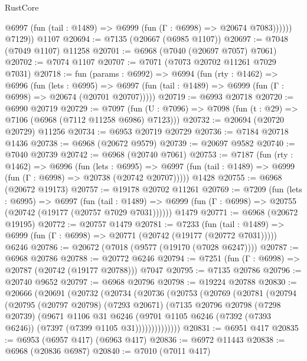 \begin{lexlean}{RustCore}
\begin{coremodule}
              @6997 (fun (tail : @1489) => @6999 (fun (Γ : @6998) => @20674 @7083))))))
        @7129))
    @1107
@20694 := @7135 (@20667 (@6985 @1107))
@20697 := @7048 (@7049 @1107) @11258
@20701 := @6968 (@7040 (@20697 @7057) @7061)
@20702 := @7074 @1107
@20707 := @7071 (@7073 @20702 @11261 @7029 @7031)
@20718 := fun (params : @6992) =>
  @6994
    (fun (rty : @1462) =>
    @6996
      (fun (lets : @6995) =>
      @6997 (fun (tail : @1489) => @6999 (fun (Γ : @6998) => @20674 (@20701 @20707)))))
@20719 := @6993 @20718
@20720 := @6990 @20719
@20729 := @7097
    (fun (U : @7096) => @7098 (fun (t : @29) => @7106 (@6968 (@7112 @11258 @6986) @7123)))
@20732 := @20694 (@20720 @20729) @11256
@20734 := @6953 @20719 @20729
@20736 := @7184 @20718 @1436
@20738 := @6968 (@20672 @9579)
@20739 := @20697 @9582
@20740 := @7040 @20739
@20742 := @6968 (@20740 @7061)
@20753 := @7187
    (fun (rty : @1462) =>
    @6996
      (fun (lets : @6995) =>
      @6997 (fun (tail : @1489) => @6999 (fun (Γ : @6998) => @20738 (@20742 @20707)))))
    @1428
@20755 := @6968 (@20672 @19173)
@20757 := @19178 @20702 @11261
@20769 := @7209
    (fun (lets : @6995) =>
    @6997
      (fun (tail : @1489) =>
      @6999 (fun (Γ : @6998) => @20755 (@20742 (@19177 (@20757 @7029 @7031))))))
    @1479
@20771 := @6968 (@20672 @19195)
@20772 := @20757 @1479
@20781 := @7233
    (fun (tail : @1489) => @6999 (fun (Γ : @6998) => @20771 (@20742 (@19177 (@20772 @7031)))))
    @6246
@20786 := @20672 (@7018 (@9577 (@19170 (@7028 @6247))))
@20787 := @6968 @20786
@20788 := @20772 @6246
@20794 := @7251 (fun (Γ : @6998) => @20787 (@20742 (@19177 @20788))) @7047
@20795 := @7135 @20786
@20796 := @20740 @9652
@20797 := @6968 @20796
@20798 := @19224 @20788
@20830 := @20666
    (@20691
      (@20732
        (@20734
          (@20736
            (@20753
              (@20769
                (@20781
                  (@20794
                    (@20795
                      (@20797 @20798)
                      (@7293 @20671)
                      (@7135
                        @20796
                        @20798
                        (@7298 @20739)
                        (@9671
                          @1106
                          @31
                          @6246
                          (@9701
                            @1105
                            @6246
                            (@7392 (@7393 @6246))
                            (@7397 (@7399 @1105 @31))))))))))))))
@20831 := @6951 @417
@20835 := @6953 (@6957 @417) (@6963 @417)
@20836 := @6972 @11443
@20838 := @6968 (@20836 @6987)
@20840 := @7010 (@7011 @417)

\end{coremodule}
\end{lexlean}
